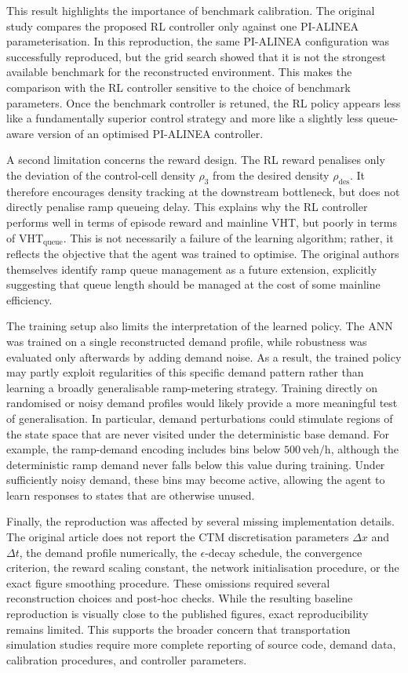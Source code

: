 This result highlights the importance of benchmark calibration. The original
study compares the proposed RL controller only against one PI-ALINEA
parameterisation. In this reproduction, the same PI-ALINEA configuration was
successfully reproduced, but the grid search showed that it is not the strongest
available benchmark for the reconstructed environment. This makes the comparison
with the RL controller sensitive to the choice of benchmark parameters. Once the
benchmark controller is retuned, the RL policy appears less like a fundamentally
superior control strategy and more like a slightly less queue-aware version of an
optimised PI-ALINEA controller.

A second limitation concerns the reward design. The RL reward penalises only the
deviation of the control-cell density \(\rho_3\) from the desired density
\(\rho_{\mathrm{des}}\). It therefore encourages density tracking at the
downstream bottleneck, but does not directly penalise ramp queueing delay. This
explains why the RL controller performs well in terms of episode reward and
mainline VHT, but poorly in terms of
\(\mathrm{VHT}_{\mathrm{queue}}\). This is not necessarily a failure of the
learning algorithm; rather, it reflects the objective that the agent was trained
to optimise. The original authors themselves identify ramp queue management as a
future extension, explicitly suggesting that queue length should be managed at
the cost of some mainline efficiency.

The training setup also limits the interpretation of the learned policy. The ANN
was trained on a single reconstructed demand profile, while robustness was
evaluated only afterwards by adding demand noise. As a result, the trained policy
may partly exploit regularities of this specific demand pattern rather than
learning a broadly generalisable ramp-metering strategy. Training directly on
randomised or noisy demand profiles would likely provide a more meaningful test
of generalisation. In particular, demand perturbations could stimulate regions of
the state space that are never visited under the deterministic base demand. For
example, the ramp-demand encoding includes bins below \(500\,\mathrm{veh/h}\),
although the deterministic ramp demand never falls below this value during
training. Under sufficiently noisy demand, these bins may become active, allowing
the agent to learn responses to states that are otherwise unused.

Finally, the reproduction was affected by several missing implementation details.
The original article does not report the CTM discretisation parameters
\(\Delta x\) and \(\Delta t\), the demand profile numerically, the
\(\epsilon\)-decay schedule, the convergence criterion, the reward scaling
constant, the network initialisation procedure, or the exact figure smoothing
procedure. These omissions required several reconstruction choices and
post-hoc checks. While the resulting baseline reproduction is visually close to
the published figures, exact reproducibility remains limited. This supports the
broader concern that transportation simulation studies require more complete
reporting of source code, demand data, calibration procedures, and controller
parameters.

\clearpage